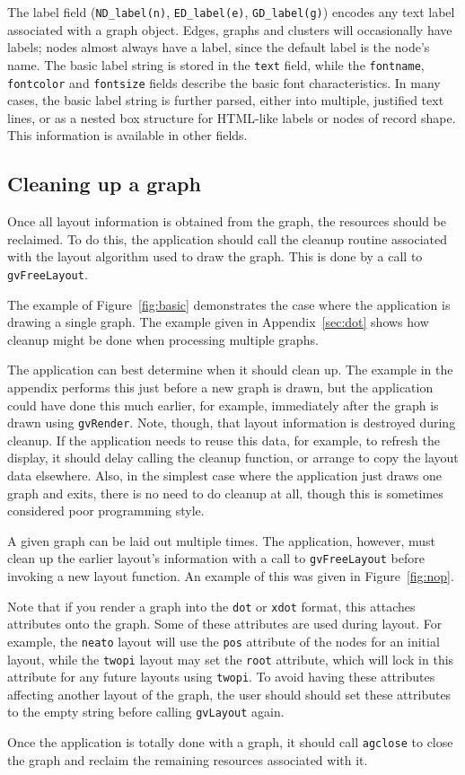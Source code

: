 The label field (\verb+ND_label(n)+, \verb+ED_label(e)+,
\verb+GD_label(g)+) encodes any text label associated with a graph object.
Edges, graphs and clusters will occasionally have labels; nodes
almost always have a label, since the default label is the node's name.
The basic label string is stored in the {\tt text} field, while the
{\tt fontname}, {\tt fontcolor} and {\tt fontsize} fields describe
the basic font characteristics.
In many cases, the basic label string is further parsed, either into
multiple, justified text lines, or as a nested box structure for
HTML-like labels or nodes of record shape.
This information is available in other fields.

\subsection{Cleaning up a graph}
\label{sec:clean}

Once all layout information is obtained from the graph, the resources
should be reclaimed. To do this, the application should call
the cleanup routine associated with the layout algorithm used to
draw the graph. This is done by a call to {\tt gvFreeLayout}.

The example of Figure~\ref{fig:basic}
demonstrates the case where the application is drawing a single graph.
The example given in Appendix~\ref{sec:dot}
shows how cleanup might be done when processing multiple graphs.

The application can best determine when it should clean up. The example
in the appendix
performs this just before a new graph is drawn, but the application could
have done this much earlier, for example, immediately after the graph
is drawn using {\tt gvRender}. Note, though, that layout information
is destroyed during cleanup. If the application needs to reuse this
data, for example, to refresh the display, it should delay calling the
cleanup function, or arrange to copy the layout data elsewhere.
Also, in the simplest case where the application just draws one graph
and exits, there is no need to do cleanup at all, though this is sometimes
considered poor programming style.

A given graph can be laid out multiple times.
The application, however, must clean up the earlier layout's
information with a call to {\tt gvFreeLayout}
before invoking a new layout function.
An example of this was given in Figure~\ref{fig:nop}.

Note that if you render a graph into the {\tt dot} or {\tt xdot}
format, this attaches attributes onto the graph. Some of these attributes
are used during layout. For example, the {\tt neato} layout will use
the {\tt pos} attribute of the nodes for an initial layout, while the
{\tt twopi} layout may set the {\tt root} attribute, which will lock in
this attribute for any future layouts using {\tt twopi}.
To avoid having these attributes affecting another
layout of the graph, the user should should set these attributes to the
empty string before calling {\tt gvLayout} again.

Once the application is totally done with a graph, it should call
{\tt agclose} to close the graph and reclaim the remaining resources associated
with it.


